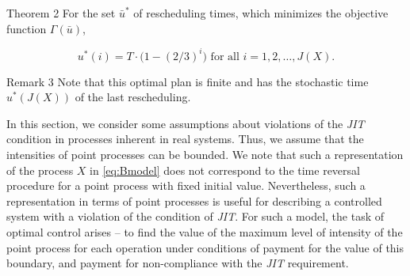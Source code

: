 
\hypertarget{b:Th2}{}

\begin{newthm}{Theorem 2} For the set $\bar{u}^*$ of rescheduling times, which minimizes the objective function ${\Gamma}(\bar{u})$,

\begin{equation}\label{eq:Theorem2}

{u^*}(i) = T\cdot \Big(1 - (2 / 3)^i \Big) \text{ for all $i = 1, 2, \dotsc , J(X)$}.

\end{equation}

\end{newthm}



\smallskip






\begin{newthm}{Remark 3} Note that this optimal plan is finite and has the stochastic time ${{u}^*}(J(X))$ of the last rescheduling.

\end{newthm}



\smallskip

 



 





	In this section, we consider some assumptions about violations of the \emph{JIT} condition in processes inherent in real systems. Thus, we assume that the intensities of point processes can be bounded. We note that such a representation of the process $X$ in \eqref{eq:Bmodel} does not correspond to the time reversal procedure for a point process with fixed initial value. Nevertheless, such a representation in terms of point processes is useful for describing a controlled system with a violation of the condition of \emph{JIT}. For such a model, the task of optimal control arises -- 	 to find the value of the maximum level of intensity of the point process for each operation under conditions of payment for the value of this boundary, and payment for non-compliance with the \emph{JIT} requirement. 



